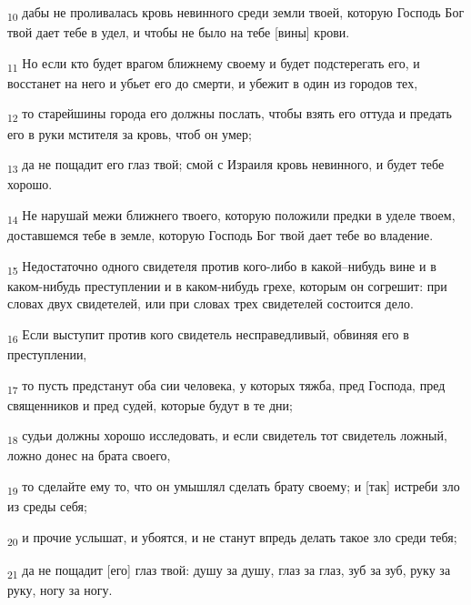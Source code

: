 \begin{tcolorbox}
\textsubscript{10} дабы не проливалась кровь невинного среди земли твоей, которую Господь Бог твой дает тебе в удел, и чтобы не было на тебе [вины] крови.
\end{tcolorbox}
\begin{tcolorbox}
\textsubscript{11} Но если кто будет врагом ближнему своему и будет подстерегать его, и восстанет на него и убьет его до смерти, и убежит в один из городов тех,
\end{tcolorbox}
\begin{tcolorbox}
\textsubscript{12} то старейшины города его должны послать, чтобы взять его оттуда и предать его в руки мстителя за кровь, чтоб он умер;
\end{tcolorbox}
\begin{tcolorbox}
\textsubscript{13} да не пощадит его глаз твой; смой с Израиля кровь невинного, и будет тебе хорошо.
\end{tcolorbox}
\begin{tcolorbox}
\textsubscript{14} Не нарушай межи ближнего твоего, которую положили предки в уделе твоем, доставшемся тебе в земле, которую Господь Бог твой дает тебе во владение.
\end{tcolorbox}
\begin{tcolorbox}
\textsubscript{15} Недостаточно одного свидетеля против кого-либо в какой--нибудь вине и в каком-нибудь преступлении и в каком-нибудь грехе, которым он согрешит: при словах двух свидетелей, или при словах трех свидетелей состоится дело.
\end{tcolorbox}
\begin{tcolorbox}
\textsubscript{16} Если выступит против кого свидетель несправедливый, обвиняя его в преступлении,
\end{tcolorbox}
\begin{tcolorbox}
\textsubscript{17} то пусть предстанут оба сии человека, у которых тяжба, пред Господа, пред священников и пред судей, которые будут в те дни;
\end{tcolorbox}
\begin{tcolorbox}
\textsubscript{18} судьи должны хорошо исследовать, и если свидетель тот свидетель ложный, ложно донес на брата своего,
\end{tcolorbox}
\begin{tcolorbox}
\textsubscript{19} то сделайте ему то, что он умышлял сделать брату своему; и [так] истреби зло из среды себя;
\end{tcolorbox}
\begin{tcolorbox}
\textsubscript{20} и прочие услышат, и убоятся, и не станут впредь делать такое зло среди тебя;
\end{tcolorbox}
\begin{tcolorbox}
\textsubscript{21} да не пощадит [его] глаз твой: душу за душу, глаз за глаз, зуб за зуб, руку за руку, ногу за ногу.
\end{tcolorbox}
